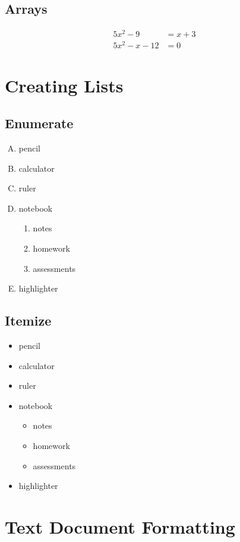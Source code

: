 \documentclass[11pt, a4paper]{article}
\begin{document}
\subsection{Arrays}
\begin{align}
       5x^2 - 9 &= x + 3\\
  5x^2 - x - 12 &= 0
\end{align}

\section{Creating Lists}

\subsection{Enumerate}

\begin{enumerate}[A.]
\item pencil
\item calculator
\item ruler
\item notebook
  \begin{enumerate}
  \item notes
  \item homework
  \item assessments
  \end{enumerate}
\item highlighter
\end{enumerate}

\subsection{Itemize}

\begin{itemize}
\item pencil
\item calculator
\item ruler
\item notebook
  \begin{itemize}
  \item notes
  \item homework
  \item assessments
  \end{itemize}
\item highlighter
\end{itemize}

\section{Text Document Formatting}
\end{document}

